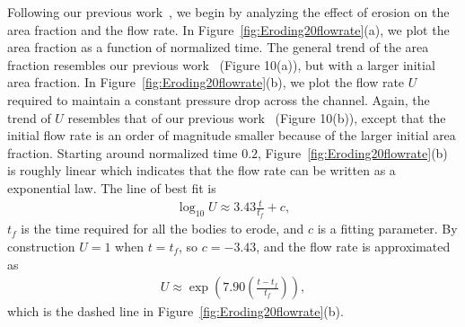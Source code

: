 \documentclass[preprint,10pt]{elsarticle}
\begin{document}
Following our previous work~\cite{qua-moo2018}, we begin by analyzing
the effect of erosion on the area fraction and the flow rate.  In
Figure~\ref{fig:Eroding20flowrate}(a), we plot the area fraction as a
function of normalized time.  The general trend of the area fraction
resembles our previous work~\cite{qua-moo2018} (Figure 10(a)), but with
a larger initial area fraction.  In
Figure~\ref{fig:Eroding20flowrate}(b), we plot the flow rate $U$
required to maintain a constant pressure drop across the channel.
Again, the trend of $U$ resembles that of our previous
work~\cite{qua-moo2018} (Figure 10(b)), except that the initial flow
rate is an order of magnitude smaller because of the larger initial area
fraction.  Starting around normalized time $0.2$,
Figure~\ref{fig:Eroding20flowrate}(b) is roughly linear which indicates
that the flow rate can be written as a exponential law.  The line of
best fit is
\begin{align} 
  \log_{10} U \approx 3.43 \frac{t}{t_f} + c, 
\end{align}
$t_f$ is the time required for all the bodies to erode, and $c$ is a
fitting parameter. By construction $U = 1$ when $t=t_f$, so $c=-3.43$,
and the flow rate is approximated as
\begin{align}
  U \approx \exp\left(7.90 \left(\frac{t - t_f}{t_f} \right)\right),
\end{align}
which is the dashed line in Figure~\ref{fig:Eroding20flowrate}(b).
\end{document}
